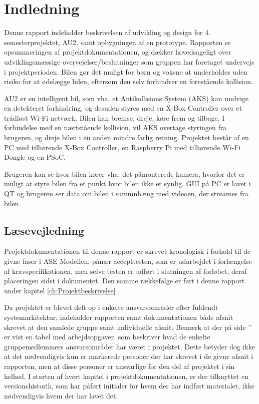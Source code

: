 \chapter{Indledning}
\label{ch:Indledning}

Denne rapport indeholder beskrivelsen af udvikling og design for 4. semesterprojektet, AU2, samt opbygningen af en prototype. 
Rapporten er opsummeringen af projektdokumentationen, og dækker hovedsageligt over udviklingsmæssige overvejelser/beslutninger som gruppen har foretaget undervejs i projektperioden. 
Bilen gør det muligt for børn og voksne at underholdes uden risiko for at ødelægge bilen, eftersom den selv forhindrer en forestående kollision.

AU2 er en intelligent bil, som vha. et Antikollisions System (AKS) kan undvige en detekteret forhindring, og desuden styres med en X-Box Controller over et trådløst Wi-Fi netværk. Bilen kan bremse, dreje, køre frem og tilbage.
I forbindelse med en nærtstående kollision, vil AKS overtage styringen fra brugeren, og dreje bilen i en anden mindre farlig retning. 
Projektet består af en PC med tilhørende X-Box Controller, en Raspberry Pi med tilhørende Wi-Fi Dongle og en PSoC. 

Brugeren kan se hvor bilen kører vha. det påmonterede kamera, hvorfor det er muligt at styre bilen fra et punkt hvor bilen ikke er synlig.
GUI på PC er lavet i QT og brugeren ser data om bilen i sammnhæng med videoen, der streames fra bilen.

\section{Læsevejledning}
Projektdokumentationen til denne rapport er skrevet kronologisk i forhold til de givne faser i ASE Modellen\cite{lib:vejledning}, pånær accepttesten, som er udarbejdet i forlængelse af kravspecifikationen, men selve testen er udført i slutningen af forløbet, deraf placeringen sidst i dokumentet.
Den samme rækkefølge er ført i denne rapport under kapitel \ref{ch:Projektbeskrivelse} .

Da projektet er blevet delt op i enkelte ansvarsområder efter fuldendt systemarkitektur, indeholder rapporten samt dokumentationen både afsnit skrevet at den samlede gruppe samt individuelle afsnit.
Bemærk at der på side '\pageref{ch:arbejdsopgaver}' er vist en tabel med arbejdsopgaver, som beskriver hvad de enkelte gruppemedlemmers ansvarsområder har været i projektet. 
Dette betyder dog ikke at det nødvendigvis kun er markerede personer der har skrevet i de givne afsnit i rapporten, men at disse personer er ansvarlige for den del af projektet i sin helhed.
I starten af hvert kapitel i projektdokumentationen, er der tilknyttet en versionshistorik, som har påført initialer for hvem der har indført materialet, ikke nødvendigvis hvem der har lavet det.

